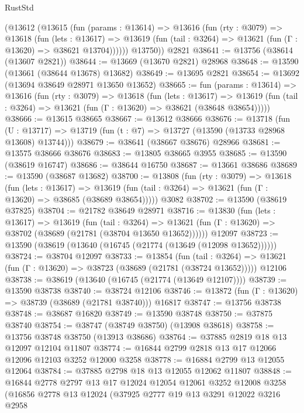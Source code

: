 \begin{lexlean}{RustStd}
\begin{coremodule}
      (@13612
        (@13615
          (fun (params : @13614) =>
          @13616
            (fun (rty : @3079) =>
            @13618
              (fun (lets : @13617) =>
              @13619 (fun (tail : @3264) => @13621 (fun (Γ : @13620) => @38621 @13704))))))
        @13750))
    @2821
@38641 := @13756 (@38614 (@13607 @2821))
@38644 := @13669 (@13670 @2821) @28968
@38648 := @13590 (@13661 (@38644 @13678) @13682)
@38649 := @13695 @2821
@38654 := @13692 (@13694 @38649 @28971 @13650 @13652)
@38665 := fun (params : @13614) =>
  @13616
    (fun (rty : @3079) =>
    @13618
      (fun (lets : @13617) =>
      @13619 (fun (tail : @3264) => @13621 (fun (Γ : @13620) => @38621 (@38648 @38654)))))
@38666 := @13615 @38665
@38667 := @13612 @38666
@38676 := @13718
    (fun (U : @13717) => @13719 (fun (t : @7) => @13727 (@13590 (@13733 @28968 @13608) @13744)))
@38679 := @38641 (@38667 @38676) @28966
@38681 := @13575 @38666 @38676
@38683 := @13805 @38665 @3955
@38685 := @13590 (@38619 @16747)
@38686 := @38644 @16750
@38687 := @13661 @38686
@38689 := @13590 (@38687 @13682)
@38700 := @13808
    (fun (rty : @3079) =>
    @13618
      (fun (lets : @13617) =>
      @13619 (fun (tail : @3264) => @13621 (fun (Γ : @13620) => @38685 (@38689 @38654)))))
    @3082
@38702 := @13590 (@38619 @37825)
@38704 := @21782 @38649 @28971
@38716 := @13830
    (fun (lets : @13617) =>
    @13619
      (fun (tail : @3264) =>
      @13621 (fun (Γ : @13620) => @38702 (@38689 (@21781 (@38704 @13650 @13652))))))
    @12097
@38723 := @13590 (@38619 (@13640 (@16745 (@21774 (@13649 (@12098 @13652))))))
@38724 := @38704 @12097
@38733 := @13854
    (fun (tail : @3264) => @13621 (fun (Γ : @13620) => @38723 (@38689 (@21781 (@38724 @13652)))))
    @12106
@38738 := @38619 (@13640 (@16745 (@21774 (@13649 @12107))))
@38739 := @13590 @38738
@38740 := @38724 @12106
@38746 := @13872 (fun (Γ : @13620) => @38739 (@38689 (@21781 @38740))) @16817
@38747 := @13756 @38738
@38748 := @38687 @16820
@38749 := @13590 @38748
@38750 := @37875 @38740
@38754 := @38747 (@38749 @38750) (@13908 @38618)
@38758 := @13756 @38748 @38750 (@13913 @38686)
@38764 := @37885 @2819 @18 @13 @12097 @12104 @11807
@38774 := @16844 @2799 @2818 @13 @17 @12066 @12096 @12103 @3252 @12000 @3258
@38778 := @16884 @2799 @13 @12055 @12064
@38784 := @37885 @2798 @18 @13 @12055 @12062 @11807
@38848 := @16844
    @2778
    @2797
    @13
    @17
    @12024
    @12054
    @12061
    @3252
    @12008
    @3258
    (@16856
      @2778
      @13
      @12024
      (@37925
        @2777
        @19
        @13
        @3291
        @12022
        @3216
        @2958

\end{coremodule}
\end{lexlean}
